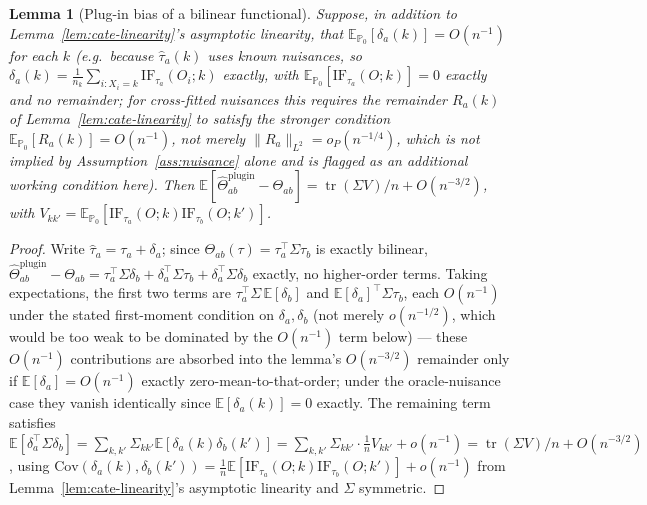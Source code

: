 \documentclass[11pt]{article}
\theoremstyle{plain}
\newtheorem{lemma}[theorem]{Lemma}
\theoremstyle{definition}
\theoremstyle{remark}
\newcommand{\E}{\mathbb{E}}
\newcommand{\PP}{\mathbb{P}}
\newcommand{\IF}{\mathrm{IF}}
\newcommand{\Cov}{\mathrm{Cov}}
\DeclareMathOperator{\tr}{tr}
\begin{document}
\begin{lemma}[Plug-in bias of a bilinear functional]\label{lem:plugin-bias}
Suppose, in addition to Lemma~\ref{lem:cate-linearity}'s asymptotic linearity, that
$\E_{\PP_0}[\delta_a(k)]=O(n^{-1})$ for each $k$ (e.g.\ because $\hat\tau_a(k)$ uses
known nuisances, so $\delta_a(k)=\frac1{n_k}\sum_{i:X_i=k}\IF_{\tau_a}(O_i;k)$ exactly,
with $\E_{\PP_0}[\IF_{\tau_a}(O;k)]=0$ exactly and no remainder; for cross-fitted
nuisances this requires the remainder $R_a(k)$ of Lemma~\ref{lem:cate-linearity} to
satisfy the stronger condition $\E_{\PP_0}[R_a(k)]=O(n^{-1})$, not merely
$\|R_a\|_{L^2}=o_P(n^{-1/4})$, which is not implied by
Assumption~\ref{ass:nuisance} alone and is flagged as an additional working
condition here). Then
$\E[\hat\Theta_{ab}^{\mathrm{plugin}}-\Theta_{ab}]=\tr(\Sigma V)/n+O(n^{-3/2})$, with
$V_{kk'}=\E_{\PP_0}[\IF_{\tau_a}(O;k)\IF_{\tau_b}(O;k')]$.
\end{lemma}
\begin{proof}
Write $\hat\tau_a=\tau_a+\delta_a$; since $\Theta_{ab}(\tau)=\tau_a^\top\Sigma\tau_b$
is exactly bilinear, $\hat\Theta_{ab}^{\mathrm{plugin}}-\Theta_{ab}=\tau_a^\top\Sigma\delta_b+\delta_a^\top\Sigma\tau_b+\delta_a^\top\Sigma\delta_b$
exactly, no higher-order terms. Taking expectations, the first two terms are
$\tau_a^\top\Sigma\,\E[\delta_b]$ and $\E[\delta_a]^\top\Sigma\tau_b$, each $O(n^{-1})$
under the stated first-moment condition on $\delta_a,\delta_b$ (not merely $o(n^{-1/2})$,
which would be too weak to be dominated by the $O(n^{-1})$ term below) --- these
$O(n^{-1})$ contributions are absorbed into the lemma's $O(n^{-3/2})$ remainder only
if $\E[\delta_a]=O(n^{-1})$ exactly zero-mean-to-that-order; under the oracle-nuisance
case they vanish identically since $\E[\delta_a(k)]=0$ exactly. The remaining term
satisfies
$\E[\delta_a^\top\Sigma\delta_b]=\sum_{k,k'}\Sigma_{kk'}\E[\delta_a(k)\delta_b(k')]=\sum_{k,k'}\Sigma_{kk'}\cdot\frac1nV_{kk'}+o(n^{-1})=\tr(\Sigma V)/n+O(n^{-3/2})$,
using $\Cov(\delta_a(k),\delta_b(k'))=\frac1n\E[\IF_{\tau_a}(O;k)\IF_{\tau_b}(O;k')]+o(n^{-1})$
from Lemma~\ref{lem:cate-linearity}'s asymptotic linearity and $\Sigma$ symmetric.
\end{proof}
\end{document}
